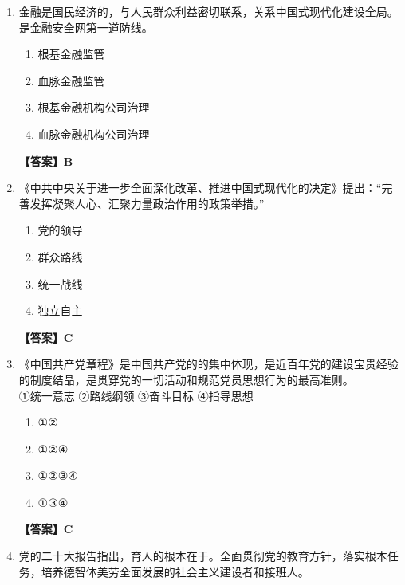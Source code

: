 \documentclass[UTF8,11pt,a4paper]{ctexart}
\begin{document}
\begin{enumerate}[label=\textbf{\arabic*.}, leftmargin=2.5em, itemsep=0.7em]
\begin{enumerate}[label=\Alph*., leftmargin=2em, itemsep=0.1em, topsep=0.15em]
\item 2027 基本实现
\item 2027 全面实现
\item 2035 基本实现
\item 2035 全面实现
\end{enumerate}
\textbf{【答案】C}
\item 金融是国民经济的\allowbreak\underline{\hspace{4em}}，与人民群众利益密切联系，关系中国式现代化建设全局。\allowbreak\underline{\hspace{4em}}是金融安全网第一道防线。
\begin{enumerate}[label=\Alph*., leftmargin=2em, itemsep=0.1em, topsep=0.15em]
\item 根基金融监管
\item 血脉金融监管
\item 根基金融机构公司治理
\item 血脉金融机构公司治理
\end{enumerate}
\textbf{【答案】B}
\item 《中共中央关于进一步全面深化改革、推进中国式现代化的决定》提出：“完善发挥\allowbreak\underline{\hspace{4em}}凝聚人心、汇聚力量政治作用的政策举措。”
\begin{enumerate}[label=\Alph*., leftmargin=2em, itemsep=0.1em, topsep=0.15em]
\item 党的领导
\item 群众路线
\item 统一战线
\item 独立自主
\end{enumerate}
\textbf{【答案】C}
\item 《中国共产党章程》是中国共产党的\allowbreak\underline{\hspace{4em}}的集中体现，是近百年党的建设宝贵经验的制度结晶，是贯穿党的一切活动和规范党员思想行为的最高准则。\\ ①统一意志 ②路线纲领 ③奋斗目标 ④指导思想
\begin{enumerate}[label=\Alph*., leftmargin=2em, itemsep=0.1em, topsep=0.15em]
\item ①②
\item ①②④
\item ①②③④
\item ①③④
\end{enumerate}
\textbf{【答案】C}
\item 党的二十大报告指出，育人的根本在于\allowbreak\underline{\hspace{4em}}。全面贯彻党的教育方针，落实\allowbreak\underline{\hspace{4em}}根本任务，培养德智体美劳全面发展的社会主义建设者和接班人。

\end{enumerate}
\end{document}
